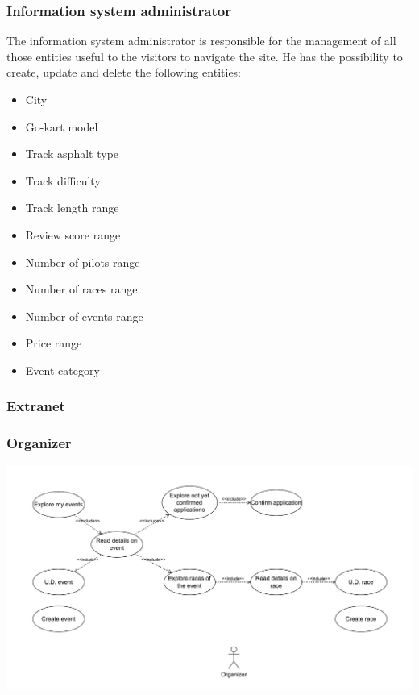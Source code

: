\documentclass{beamer}
\begin{document}
\begin{frame}
    \frametitle{Information system administrator}
    The information system administrator is responsible for the management of 
    all those entities useful to the visitors to navigate the site.
    He has the possibility to create, update and delete the following entities:
    \begin{itemize}
        \item City
        \item Go-kart model
        \item Track asphalt type
        \item Track difficulty
        \item Track length range
        \item Review score range
        \item Number of pilots range
        \item Number of races range
        \item Number of events range
        \item Price range
        \item Event category
    \end{itemize} 
\end{frame}

\subsubsection{Extranet}

\begin{frame}
    \frametitle{Organizer}
    \centering
    \includegraphics[width=0.9\linewidth]{drawio/organizer.pdf}
\end{frame}
\end{document}
